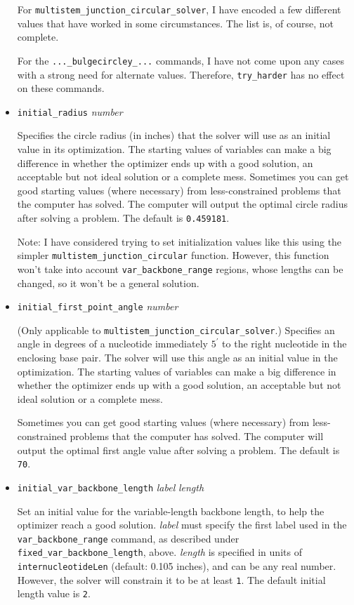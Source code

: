 \documentclass[letterpaper,12pt]{report}
\begin{document}
\begin{itemize}
For {\tt multistem\_junction\_circular\_solver}, I have encoded a few different values
that have worked in some circumstances.  The list is, of course, not complete.

For the {\tt ...\_bulgecircley\_...} commands, I have not come upon any cases
with a strong need for alternate
values.  Therefore, {\tt try\_harder} has no effect on these commands.

\item
{\tt initial\_radius} {\it number}

Specifies the circle radius (in inches) that the solver will use as an initial value in its optimization.
The starting values of variables can make a big difference in whether the optimizer
ends up with a good solution, an acceptable but not ideal solution or a complete mess.
Sometimes you can get good starting values (where necessary) from less-constrained problems
that the computer has solved.  The computer will output the optimal circle radius
after solving a problem.
The default is {\tt 0.459181}.

Note: I have considered trying to set initialization values like this using the simpler
{\tt multistem\_junction\_circular} function.  However, this function won't take into
account {\tt var\_backbone\_range} regions, whose lengths can be changed, so it won't
be a general solution.
\item
{\tt initial\_first\_point\_angle} {\it number}

(Only applicable to {\tt multistem\_junction\_circular\_solver}.)
Specifies an angle in degrees of a nucleotide immediately $5^\prime$ 
to the right nucleotide in the enclosing base pair.
The solver will use this angle as an initial value in the optimization.
The starting values of variables can make a big difference in whether the optimizer
ends up with a good solution, an acceptable but not ideal solution or a complete mess.

Sometimes you can get good starting values (where necessary) from less-constrained problems
that the computer has solved.  The computer will output the optimal first angle value
after solving a problem.
The default is {\tt 70}.
\item {\tt initial\_var\_backbone\_length} {\it label} {\it length}

Set an initial value for the variable-length backbone length, to help the optimizer reach a good
solution.  {\it label} must specify the first label used in the {\tt var\_backbone\_range}
command, as described under {\tt fixed\_var\_backbone\_length}, above.
{\it length} is specified in units of {\tt internucleotideLen} (default: 0.105 inches),
and can be any real number.
However, the solver will constrain it to be at least {\tt 1}.
The default initial length value is {\tt 2}.
\end{itemize}
\end{document}
